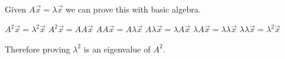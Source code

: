 \\
		\newline
		Given $A \vec{x} = \lambda\vec{x}$ we can prove this with basic algebra.
		\begin{center}
		    $A^2 \vec{x}= \lambda^2\vec{x}$
		    \newline
		    $A^2 \vec{x}= AA\vec{x}$
		    \newline
		    $AA \vec{x} = A\lambda\vec{x}$
		    \newline
		    $A \lambda \vec{x} = \lambda A\vec{x}$
		    \newline
		    $\lambda A \vec{x} = \lambda\lambda\vec{x}$
		    \newline
		    $\lambda \lambda \vec{x} = \lambda^2\vec{x}$
		    \newline
		\end{center}
		Therefore proving $\lambda^2$ is an eigenvalue of $A^2$.
